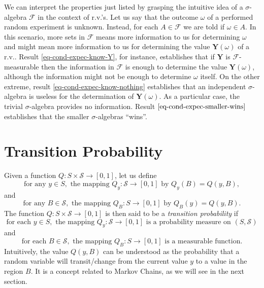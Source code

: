 We can interpret the properties just listed by grasping the intuitive idea of a $\sigma$-algebra $\mathcal{F}$ in the context of r.v.'s.
Let us say that the outcome $\omega$ of a performed random experiment is unknown. Instead, for each $A\in\mathcal{F}$ we are told if $\omega\in A$.
In this scenario, more sets in $\mathcal{F}$ means more information to us for determining $\omega$ and might mean more information to us for determining the value $\mathbf{Y}(\omega)$ of a r.v..
Result \eqref{eq-cond-expec-know-Y}, for instance, establishes that if $\mathbf{Y}$ is $\mathcal{F}$-measurable then the information in $\mathcal{F}$ is enough to determine the value $\mathbf{Y}(\omega)$,
although the information might not be enough to determine $\omega$ itself.
On the other extreme, result \eqref{eq-cond-expec-know-nothing} establishes that an independent $\sigma$-algebra is useless for the determination of $\mathbf{Y}(\omega)$.
As a particular case, the trivial $\sigma$-algebra provides no information.
Result $\eqref{eq-cond-expec-smaller-wins}$ establishes that the smaller $\sigma$-algebras ``wins''.

\section{Transition Probability}

Given a function $Q:S\times\mathcal{S}\rightarrow [0,1]$, let us define
\begin{equation*}
\text{for any }y\in S,\text{ the mapping }Q_y:\mathcal{S}\rightarrow [0,1]\text{ by }Q_y(B)=Q(y,B),
\end{equation*}
and
\begin{equation*}
\text{for any }B\in\mathcal{S},\text{ the mapping }Q_B:S\rightarrow [0,1]\text{ by }Q_B(y)=Q(y,B).
\end{equation*}
The function $Q:S\times\mathcal{S}\rightarrow [0,1]$ is then said to be a {\it transition probability} if
\begin{equation*}
\text{for each }y\in S,\text{ the mapping }Q_y:\mathcal{S}\rightarrow [0,1]\text{ is a probability measure on }(S,\mathcal{S})
\end{equation*}
and
\begin{equation*}
\text{for each }B\in\mathcal{S},\text{ the mapping }Q_B:S\rightarrow [0,1]\text{ is a measurable function}.
\end{equation*}
Intuitively, the value $Q(y,B)$ can be understood as
the probability that a random variable will transit/change from the current value $y$ to a value in the region $B$.
It is a concept related to Markov Chains, as we will see in the next section.

